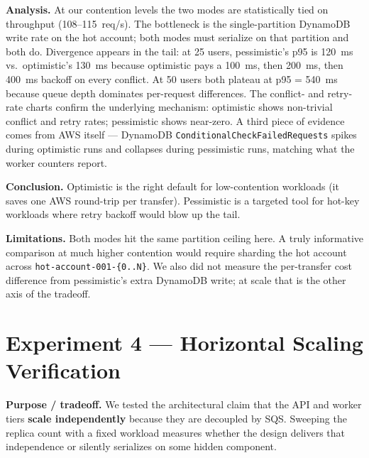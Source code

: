 \documentclass[10pt,a4paper]{article}
\begin{document}
\begin{analysisbox}
\textbf{Analysis.} At our contention levels the two modes are statistically tied on throughput (108--115~req/s). The bottleneck is the single-partition DynamoDB write rate on the hot account; both modes must serialize on that partition and both do. Divergence appears in the tail: at 25 users, pessimistic's p95 is 120~ms vs.\ optimistic's 130~ms because optimistic pays a 100~ms, then 200~ms, then 400~ms backoff on every conflict. At 50 users both plateau at p95 = 540~ms because queue depth dominates per-request differences. The conflict- and retry-rate charts confirm the underlying mechanism: optimistic shows non-trivial conflict and retry rates; pessimistic shows near-zero. A third piece of evidence comes from AWS itself --- DynamoDB \texttt{ConditionalCheckFailedRequests} spikes during optimistic runs and collapses during pessimistic runs, matching what the worker counters report.

\medskip
\textbf{Conclusion.} Optimistic is the right default for low-contention workloads (it saves one AWS round-trip per transfer). Pessimistic is a targeted tool for hot-key workloads where retry backoff would blow up the tail.
\end{analysisbox}

\begin{limitbox}
\textbf{Limitations.} Both modes hit the same partition ceiling here. A truly informative comparison at much higher contention would require sharding the hot account across \texttt{hot-account-001-\{0..N\}}. We also did not measure the per-transfer cost difference from pessimistic's extra DynamoDB write; at scale that is the other axis of the tradeoff.
\end{limitbox}

\section{Experiment 4 --- Horizontal Scaling Verification}

\begin{purposebox}
\textbf{Purpose / tradeoff.} We tested the architectural claim that the API and worker tiers \textbf{scale independently} because they are decoupled by SQS. Sweeping the replica count with a fixed workload measures whether the design delivers that independence or silently serializes on some hidden component.
\end{purposebox}
\end{document}

